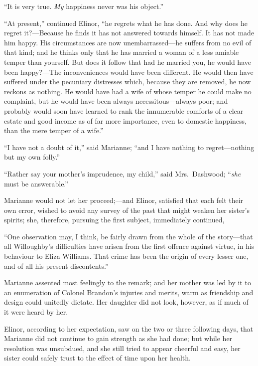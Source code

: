 \documentclass{article}
\begin{document}
``It is very true.  \emph{My} happiness never was his object.''

``At present,'' continued Elinor, ``he regrets what he
has done.  And why does he regret it?---Because he finds
it has not answered towards himself.  It has not made
him happy.  His circumstances are now unembarrassed---he
suffers from no evil of that kind; and he thinks only
that he has married a woman of a less amiable temper
than yourself.  But does it follow that had he married you,
he would have been happy?---The inconveniences would have
been different.  He would then have suffered under the
pecuniary distresses which, because they are removed,
he now reckons as nothing.  He would have had a wife
of whose temper he could make no complaint, but he would
have been always necessitous---always poor; and probably
would soon have learned to rank the innumerable comforts
of a clear estate and good income as of far more importance,
even to domestic happiness, than the mere temper of a wife.''

``I have not a doubt of it,'' said Marianne; ``and I
have nothing to regret---nothing but my own folly.''

``Rather say your mother's imprudence, my child,''
said Mrs.\ Dashwood; ``\emph{she} must be answerable.''

Marianne would not let her proceed;---and Elinor,
satisfied that each felt their own error, wished to avoid
any survey of the past that might weaken her sister's
spirits; she, therefore, pursuing the first subject,
immediately continued,

``One observation may, I think, be fairly drawn from
the whole of the story---that all Willoughby's difficulties
have arisen from the first offence against virtue, in his
behaviour to Eliza Williams.  That crime has been the origin
of every lesser one, and of all his present discontents.''

Marianne assented most feelingly to the remark;
and her mother was led by it to an enumeration of Colonel
Brandon's injuries and merits, warm as friendship
and design could unitedly dictate.  Her daughter did
not look, however, as if much of it were heard by her.

Elinor, according to her expectation, saw on the two
or three following days, that Marianne did not continue
to gain strength as she had done; but while her resolution
was unsubdued, and she still tried to appear cheerful
and easy, her sister could safely trust to the effect
of time upon her health.
\end{document}
